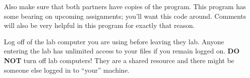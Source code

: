 \documentclass[12pt,oneside]{memoir}
\begin{document}
Also make sure that both partners have copies of the program. This
program has some bearing on upcoming assignments; you'll want this
code around. Comments will also be very helpful in this program for
exactly that reason.

\Large{Log off of the lab computer you are using before leaving they
  lab. Anyone entering the lab has unlimited access to your files if
  you remain logged on. \textbf{DO NOT} turn off lab computers! They
  are a shared resource and there might be someone else logged in to
  ``your'' machine.}
\end{document}

